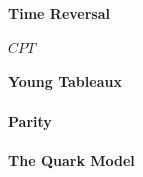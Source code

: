 \paragraph{Time Reversal}

\paragraph{$CPT$}

\paragraph{Young Tableaux}

\paragraph{Parity}

\paragraph{The Quark Model}